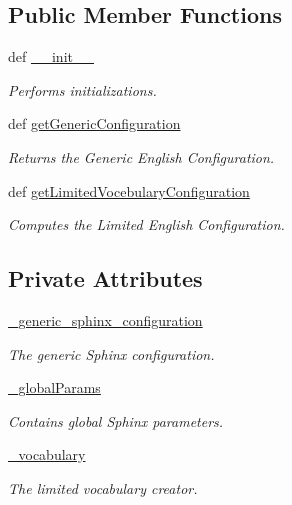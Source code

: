 \subsection*{Public Member Functions}
\begin{DoxyCompactItemize}
\item 
def \hyperlink{classrapp__speech__detection__sphinx4_1_1language__support_1_1LanguageSupport_a12863f329827740988b539514d737f40}{\-\_\-\-\_\-init\-\_\-\-\_\-}
\begin{DoxyCompactList}\small\item\em Performs initializations. \end{DoxyCompactList}\item 
def \hyperlink{classrapp__speech__detection__sphinx4_1_1language__support_1_1LanguageSupport_a3edada229197caddb4fd2e21e2315b76}{get\-Generic\-Configuration}
\begin{DoxyCompactList}\small\item\em Returns the Generic English Configuration. \end{DoxyCompactList}\item 
def \hyperlink{classrapp__speech__detection__sphinx4_1_1language__support_1_1LanguageSupport_a956a0b9445f1f32388bea86a6c868724}{get\-Limited\-Vocebulary\-Configuration}
\begin{DoxyCompactList}\small\item\em Computes the Limited English Configuration. \end{DoxyCompactList}\end{DoxyCompactItemize}
\subsection*{Private Attributes}
\begin{DoxyCompactItemize}
\item 
\hyperlink{classrapp__speech__detection__sphinx4_1_1language__support_1_1LanguageSupport_a5f99c19c39c7eaf8d3bd4d0fb8a8bff7}{\-\_\-generic\-\_\-sphinx\-\_\-configuration}
\begin{DoxyCompactList}\small\item\em The generic Sphinx configuration. \end{DoxyCompactList}\item 
\hyperlink{classrapp__speech__detection__sphinx4_1_1language__support_1_1LanguageSupport_a0cece024496507253ae43b38e17ab7cd}{\-\_\-global\-Params}
\begin{DoxyCompactList}\small\item\em Contains global Sphinx parameters. \end{DoxyCompactList}\item 
\hyperlink{classrapp__speech__detection__sphinx4_1_1language__support_1_1LanguageSupport_a24caae7e914e0d89f6baf5d59298cda9}{\-\_\-vocabulary}
\begin{DoxyCompactList}\small\item\em The limited vocabulary creator. \end{DoxyCompactList}\end{DoxyCompactItemize}


